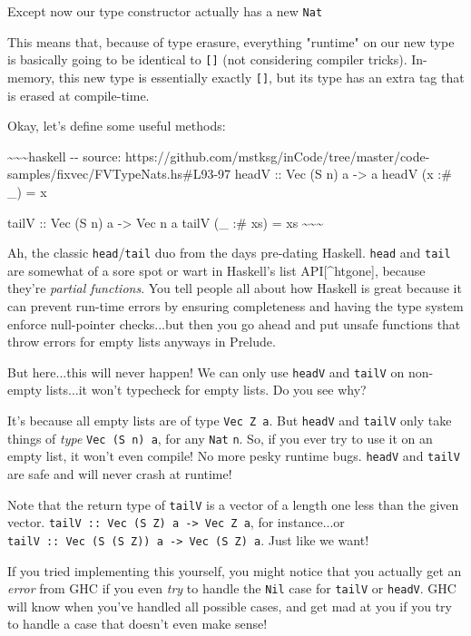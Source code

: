 \documentclass[]{article}
\begin{document}
Except now our type constructor actually has a new \texttt{Nat}

This means that, because of type erasure, everything "runtime" on our new type
is basically going to be identical to \texttt{{[}{]}} (not considering compiler
tricks). In-memory, this new type is essentially exactly \texttt{{[}{]}}, but
its type has an extra tag that is erased at compile-time.

Okay, let's define some useful methods:

\textasciitilde{}\textasciitilde{}\textasciitilde{}haskell -\/- source:
https://github.com/mstksg/inCode/tree/master/code-samples/fixvec/FVTypeNats.hs\#L93-97
headV :: Vec (S n) a -\textgreater{} a headV (x :\# \_) = x

tailV :: Vec (S n) a -\textgreater{} Vec n a tailV (\_ :\# xs) = xs
\textasciitilde{}\textasciitilde{}\textasciitilde{}

Ah, the classic \texttt{head}/\texttt{tail} duo from the days pre-dating
Haskell. \texttt{head} and \texttt{tail} are somewhat of a sore spot or wart in
Haskell's list API{[}\^{}htgone{]}, because they're \emph{partial functions}.
You tell people all about how Haskell is great because it can prevent run-time
errors by ensuring completeness and having the type system enforce null-pointer
checks...but then you go ahead and put unsafe functions that throw errors for
empty lists anyways in Prelude.

But here...this will never happen! We can only use \texttt{headV} and
\texttt{tailV} on non-empty lists...it won't typecheck for empty lists. Do you
see why?

It's because all empty lists are of type \texttt{Vec\ Z\ a}. But \texttt{headV}
and \texttt{tailV} only take things of \emph{type} \texttt{Vec\ (S\ n)\ a}, for
any \texttt{Nat} \texttt{n}. So, if you ever try to use it on an empty list, it
won't even compile! No more pesky runtime bugs. \texttt{headV} and
\texttt{tailV} are safe and will never crash at runtime!

Note that the return type of \texttt{tailV} is a vector of a length one less
than the given vector.
\texttt{tailV\ ::\ Vec\ (S\ Z)\ a\ -\textgreater{}\ Vec\ Z\ a}, for
instance...or
\texttt{tailV\ ::\ Vec\ (S\ (S\ Z))\ a\ -\textgreater{}\ Vec\ (S\ Z)\ a}. Just
like we want!

If you tried implementing this yourself, you might notice that you actually get
an \emph{error} from GHC if you even \emph{try} to handle the \texttt{Nil} case
for \texttt{tailV} or \texttt{headV}. GHC will know when you've handled all
possible cases, and get mad at you if you try to handle a case that doesn't even
make sense!
\end{document}
